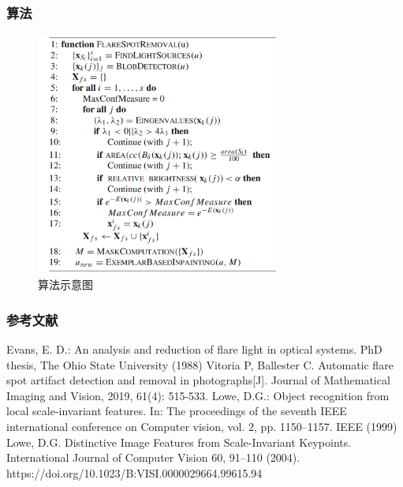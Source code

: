 \documentclass{beamer}
\begin{document}
\begin{frame}
\frametitle{算法}
\begin{figure}[!h]
\centering
\includegraphics[height=8cm,width=8cm]{图片1.png}
\caption{算法示意图}
\end{figure}

\end{frame}
\begin{frame}
\frametitle{参考文献}
\begin{thebibliography}{99}
Evans, E. D.: An analysis and reduction of flare light in optical
systems. PhD thesis, The Ohio State University (1988)
Vitoria P, Ballester C. Automatic flare spot artifact detection and removal in photographs[J]. Journal of Mathematical Imaging and Vision, 2019, 61(4): 515-533.
 Lowe, D.G.: Object recognition from local scale-invariant features.
In: The proceedings of the seventh IEEE international conference
on Computer vision, vol. 2, pp. 1150–1157. IEEE (1999)
Lowe, D.G. Distinctive Image Features from Scale-Invariant Keypoints. International Journal of Computer Vision 60, 91–110 (2004). https://doi.org/10.1023/B:VISI.0000029664.99615.94
\end{thebibliography}
\end{frame}
\end{document}
